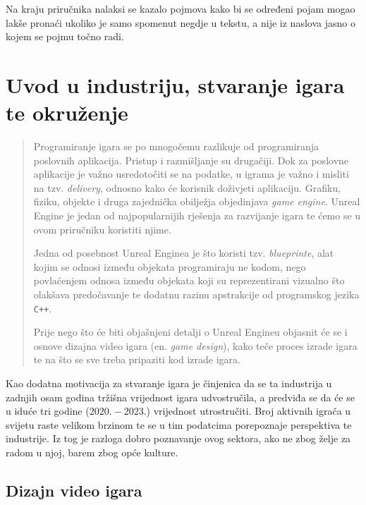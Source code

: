 \documentclass[a4paper,10pt]{article}
\begin{document}
Na kraju priručnika nalaksi se kazalo pojmova kako bi se određeni pojam mogao
lakše pronaći ukoliko je samo spomenut negdje u tekstu, a nije iz naslova jasno
o kojem se pojmu točno radi.

\pagebreak

\section{Uvod u industriju, stvaranje igara te okruženje}

\begin{quote}
	\small
	Programiranje igara se po mnogočemu razlikuje od programiranja
	poslovnih aplikacija. Pristup i razmišljanje su drugačiji. Dok za
	poslovne aplikacije je važno usredotočiti se na podatke, u igrama je
	važno i misliti na tzv. \textit{delivery}, odnosno kako će korisnik
	doživjeti aplikaciju. Grafiku, fiziku, objekte i druga zajednička
	obilježja objedinjava \textit{game engine}. Unreal Engine je jedan od
	najpopularnijih rješenja za razvijanje igara te ćemo se u ovom
	priručniku koristiti njime.

	Jedna od posebnost Unreal Enginea je što koristi tzv.
	\textit{blueprinte}, alat kojim se odnosi između objekata programiraju
	ne kodom, nego povlaćenjem odnosa između objekata koji su
	reprezentirani vizualno što olakšava predočavanje te dodatnu razinu
	apstrakcije od programskog jezika \texttt{C++}.

	Prije nego što će biti objašnjeni detalji o Unreal Engineu objasnit će
	se i osnove dizajna video igara (en. \textit{game design}), kako teče
	proces izrade igara te na što se sve treba pripaziti kod izrade igara.
\end{quote}

Kao dodatna motivacija za stvaranje igara je činjenica da se ta industrija u
zadnjih osam godina tržišna vrijednost igara udvostručila, a predviđa se da će
se u iduće tri godine ($2020.-2023.$) vrijednost utrostručiti. Broj aktivnih
igrača u svijetu raste velikom brzinom te se u tim podatcima porepoznaje
perspektiva te industrije. Iz tog je razloga dobro poznavanje ovog sektora, ako
ne zbog želje za radom u njoj, barem zbog opće kulture.

\subsection{Dizajn video igara}
\end{document}
